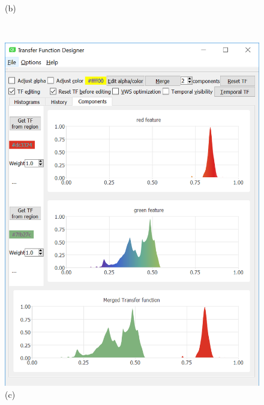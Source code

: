 \documentclass[twoside,twocolumn,10pt]{article}
\begin{document}
\begin{figure}
\begin{minipage}{.36\textwidth}
		(b)
	\end{minipage}\\
	\begin{minipage}{.4\textwidth}
		\centering
		\includegraphics[width=1\linewidth]{tf_supernova_merged_red_green}
		(c)
	\end{minipage}~
	\begin{minipage}{.4\textwidth}
		\centering

\end{minipage}
\end{figure}
\end{document}
